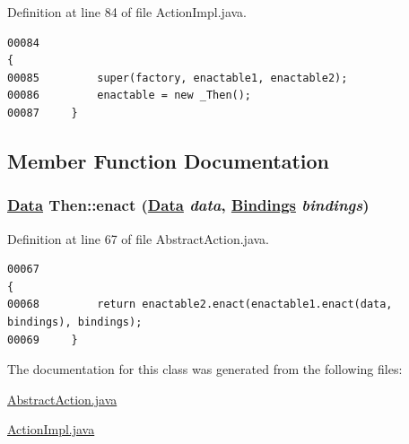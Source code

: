 Definition at line 84 of file Action\-Impl.java.\footnotesize\begin{verbatim}00084                                                                                  {
00085         super(factory, enactable1, enactable2);
00086         enactable = new _Then();
00087     }
\end{verbatim}\normalsize 


\subsection{Member Function Documentation}
\hypertarget{classThen_a1}{
\subsubsection[enact]{\setlength{\rightskip}{0pt plus 5cm}\hyperlink{interfaceData}{Data} Then::enact (\hyperlink{interfaceData}{Data} {\em data}, \hyperlink{interfaceBindings}{Bindings} {\em bindings})}}
\label{classThen_a1}




Definition at line 67 of file Abstract\-Action.java.\footnotesize\begin{verbatim}00067                                                                                {
00068         return enactable2.enact(enactable1.enact(data, bindings), bindings);
00069     }
\end{verbatim}\normalsize 


The documentation for this class was generated from the following files:\begin{CompactItemize}
\item 
\hyperlink{AbstractAction_8java-source}{Abstract\-Action.java}\item 
\hyperlink{ActionImpl_8java-source}{Action\-Impl.java}\end{CompactItemize}
